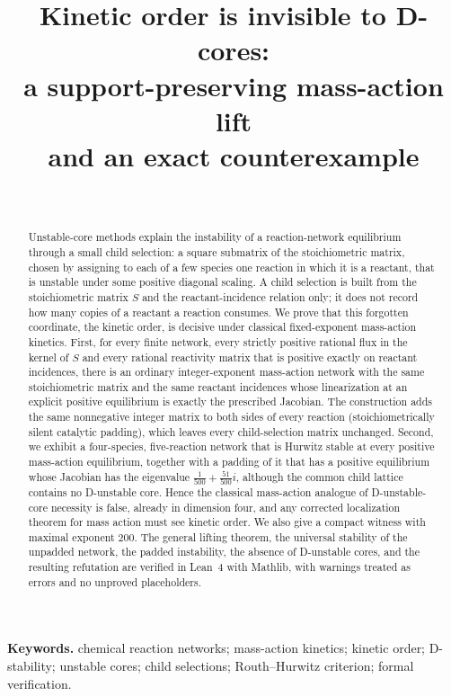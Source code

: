 \documentclass[11pt,a4paper]{article}
\title{Kinetic order is invisible to D-cores:\\ a support-preserving mass-action lift\\ and an exact counterexample}
\author{\PaperAuthor\\ \PaperAffiliation}
\date{\PaperDate}
\theoremstyle{plain}
\theoremstyle{definition}
\theoremstyle{remark}
\begin{document}
\maketitle

\begin{abstract}
Unstable-core methods explain the instability of a reaction-network equilibrium through a small child selection: a square submatrix of the stoichiometric matrix, chosen by assigning to each of a few species one reaction in which it is a reactant, that is unstable under some positive diagonal scaling. A child selection is built from the stoichiometric matrix $S$ and the reactant-incidence relation only; it does not record how many copies of a reactant a reaction consumes. We prove that this forgotten coordinate, the kinetic order, is decisive under classical fixed-exponent mass-action kinetics. First, for every finite network, every strictly positive rational flux in the kernel of $S$ and every rational reactivity matrix that is positive exactly on reactant incidences, there is an ordinary integer-exponent mass-action network with the same stoichiometric matrix and the same reactant incidences whose linearization at an explicit positive equilibrium is exactly the prescribed Jacobian. The construction adds the same nonnegative integer matrix to both sides of every reaction (stoichiometrically silent catalytic padding), which leaves every child-selection matrix unchanged. Second, we exhibit a four-species, five-reaction network that is Hurwitz stable at every positive mass-action equilibrium, together with a padding of it that has a positive equilibrium whose Jacobian has the eigenvalue $\tfrac{1}{500}+\tfrac{51}{500}i$, although the common child lattice contains no D-unstable core. Hence the classical mass-action analogue of D-unstable-core necessity is false, already in dimension four, and any corrected localization theorem for mass action must see kinetic order. We also give a compact witness with maximal exponent $200$. The general lifting theorem, the universal stability of the unpadded network, the padded instability, the absence of D-unstable cores, and the resulting refutation are verified in Lean~4 with Mathlib, with warnings treated as errors and no unproved placeholders.
\end{abstract}

\noindent\textbf{Keywords.} chemical reaction networks; mass-action kinetics; kinetic order; D-stability; unstable cores; child selections; Routh--Hurwitz criterion; formal verification.
\end{document}
